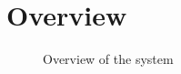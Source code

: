 \chapter{Overview}

\begin{figure}[H]
\centering
{}
\scalebox{0.8}{
}
\caption{Overview of the system}
\label{fig:SystemOverview}
\end{figure}
